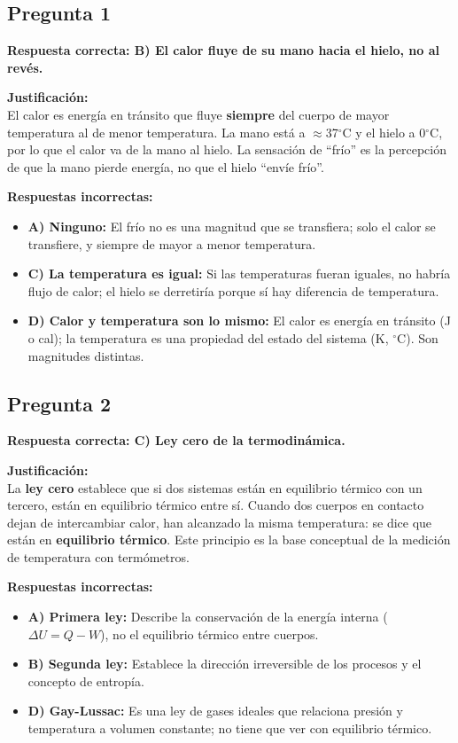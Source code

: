 \begin{respuestabox}
\subsection*{Pregunta 1}
\textcolor{verdecorrecto}{\textbf{Respuesta correcta: B) El calor fluye de su mano hacia el hielo, no al revés.}}

\textbf{Justificación:}\\
El calor es energía en tránsito que fluye \textbf{siempre} del cuerpo de mayor temperatura al de menor temperatura. La mano está a $\approx$37$^\circ$C y el hielo a 0$^\circ$C, por lo que el calor va de la mano al hielo. La sensación de ``frío'' es la percepción de que la mano pierde energía, no que el hielo ``envíe frío''.

\textbf{Respuestas incorrectas:}
\begin{itemize}
    \item \textbf{A) Ninguno:} El frío no es una magnitud que se transfiera; solo el calor se transfiere, y siempre de mayor a menor temperatura.
    \item \textbf{C) La temperatura es igual:} Si las temperaturas fueran iguales, no habría flujo de calor; el hielo se derretiría porque sí hay diferencia de temperatura.
    \item \textbf{D) Calor y temperatura son lo mismo:} El calor es energía en tránsito (J o cal); la temperatura es una propiedad del estado del sistema (K, $^\circ$C). Son magnitudes distintas.
\end{itemize}
\end{respuestabox}

\begin{respuestabox}
\subsection*{Pregunta 2}
\textcolor{verdecorrecto}{\textbf{Respuesta correcta: C) Ley cero de la termodinámica.}}

\textbf{Justificación:}\\
La \textbf{ley cero} establece que si dos sistemas están en equilibrio térmico con un tercero, están en equilibrio térmico entre sí. Cuando dos cuerpos en contacto dejan de intercambiar calor, han alcanzado la misma temperatura: se dice que están en \textbf{equilibrio térmico}. Este principio es la base conceptual de la medición de temperatura con termómetros.

\textbf{Respuestas incorrectas:}
\begin{itemize}
    \item \textbf{A) Primera ley:} Describe la conservación de la energía interna ($\Delta U = Q - W$), no el equilibrio térmico entre cuerpos.
    \item \textbf{B) Segunda ley:} Establece la dirección irreversible de los procesos y el concepto de entropía.
    \item \textbf{D) Gay-Lussac:} Es una ley de gases ideales que relaciona presión y temperatura a volumen constante; no tiene que ver con equilibrio térmico.
\end{itemize}
\end{respuestabox}


